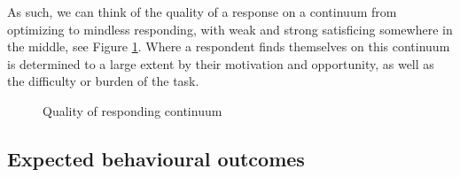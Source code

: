 \documentclass[Royal,times,sageh]{sagej}
\begin{document}
As such, we can think of the quality of a response on a continuum from
optimizing to mindless responding, with weak and strong satisficing
somewhere in the middle, see Figure \ref{fig:continuum}. Where a
respondent finds themselves on this continuum is determined to a large
extent by their motivation and opportunity, as well as the difficulty or
burden of the task.

\begin{figure}
\centering
{}
\caption{Quality of responding continuum}
\label{fig:continuum}
\end{figure}

\hypertarget{expected-behavioural-outcomes}{%
\subsection{Expected behavioural
outcomes}\label{expected-behavioural-outcomes}}
\end{document}
